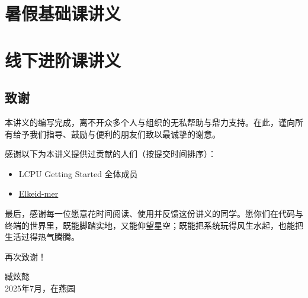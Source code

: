 \documentclass[12pt, openany]{book}
\let\oldhref\href
\renewcommand{\href}[2]{%
  \oldhref{#1}{%
    \color{blue}\underline{#2}%
    \raisebox{0.2ex}{\tiny$\nearrow$}%
  }%
}
\begin{document}
\tableofcontents


\part{暑假基础课讲义}







\part{线下进阶课讲义}









\backmatter 

\chapter{致谢}

本讲义的编写完成，离不开众多个人与组织的无私帮助与鼎力支持。在此，谨向所有给予我们指导、鼓励与便利的朋友们致以最诚挚的谢意。

感谢以下为本讲义提供过贡献的人们（按提交时间排序）：

\begin{itemize}
  \item LCPU Getting Started 全体成员
  \item \faGithub\href{https://github.com/Elkeid-mer}{Elkeid-mer}
\end{itemize}

最后，感谢每一位愿意花时间阅读、使用并反馈这份讲义的同学。愿你们在代码与终端的世界里，既能脚踏实地，又能仰望星空；既能把系统玩得风生水起，也能把生活过得热气腾腾。

再次致谢！

\vspace{2em}
\begin{flushright}
  臧炫懿 \\
  2025年7月，在燕园
\end{flushright}
\end{document}
